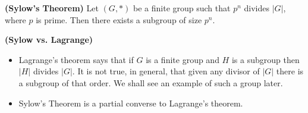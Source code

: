 \documentclass{article}
\newcommand{\bfs}[1]{\textbf{({#1}) }}
\begin{document}
\begin{thma}{\bfs{Sylow's Theorem}}\label{thm:sylow}
 Let $(G, *)$ be a finite group such that $p^{n}$ divides $|G|$, where $p$ is prime. Then there exists a subgroup of size $p^{n}$.
\end{thma}
\begin{rema}{\bfs{Sylow vs. Lagrange}}\label{rm:sylowvslag}
\begin{itemize}
    \item Lagrange's theorem says that if $G$ is a finite group and $H$ is a subgroup then $|H|$ divides $|G| .$ It is not true, in general, that given any divisor of $|G|$ there is a subgroup of that order. We shall see an example of such a group later.
    \item Sylow's Theorem is a partial converse to Lagrange's theorem.
\end{itemize}
\end{rema}
\end{document}
